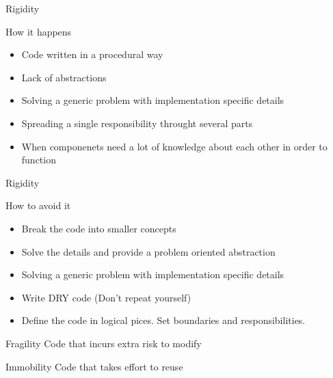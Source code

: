 \documentclass[xcolor=svgnames, handout]{beamer}
\begin{document}
{%
%
\begin{frame}{Rigidity}

    How it happens
    \begin{itemize}
        \item<1-> Code written in a procedural way
        \item<2-> Lack of abstractions
        \item<3-> Solving a generic problem with implementation specific details
        \item<4-> Spreading a single responsibility throught several parts
        \item<5-> When componenets need a lot of knowledge about each other in
            order to function
    \end{itemize}
\end{frame}
}


{%
%
\begin{frame}{Rigidity}

    How to avoid it
    \begin{itemize}
        \item<1-> Break the code into smaller concepts
        \item<2-> Solve the details and provide a problem oriented abstraction
        \item<3-> Solving a generic problem with implementation specific details
        \item<4-> Write DRY code (Don't repeat yourself)
        \item<5-> Define the code in logical pices.  Set boundaries and
            responsibilities.
    \end{itemize}
\end{frame}
}


\begin{frame}{Fragility}
    Code that incurs extra risk to modify
\end{frame}


\begin{frame}{Immobility}
    Code that takes effort to reuse
\end{frame}
\end{document}
